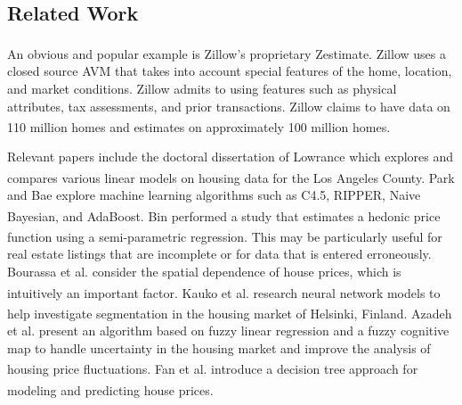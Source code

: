\documentclass[letter,10pt]{article}
\begin{document}
\begin{multicols}{2}
		\section{Related Work}
		An obvious and popular example is Zillow's proprietary Zestimate\textsuperscript{\textregistered}. Zillow uses a closed source AVM that takes into account special features of the home, location, and market conditions. Zillow admits to using features such as physical attributes, tax assessments, and prior transactions. Zillow claims to have data on 110 million homes and estimates on approximately 100 million homes.\textsuperscript{\cite{zillow}}
		\par
		Relevant papers include the doctoral dissertation of Lowrance which explores and compares various linear models on housing data for the Los Angeles County.\textsuperscript{\cite{lowrance}} Park and Bae explore machine learning algorithms such as C4.5, RIPPER, Naive Bayesian, and AdaBoost.\textsuperscript{\cite{park}} Bin performed a study that estimates a hedonic price function using a semi-parametric regression.\textsuperscript{\cite{bin}} This may be particularly useful for real estate listings that are incomplete or for data that is entered erroneously. Bourassa et al. consider the spatial dependence of house prices, which is intuitively an important factor.\textsuperscript{\cite{bourassa1}\cite{bourassa2}} Kauko et al. research neural network models to help investigate segmentation in the housing market of Helsinki, Finland.\textsuperscript{\cite{kauko}} Azadeh et al. present an algorithm based on fuzzy linear regression and a fuzzy cognitive map to handle uncertainty in the housing market and improve the analysis of housing price fluctuations.\textsuperscript{\cite{azadeh}} Fan et al. introduce a decision tree approach for modeling and predicting house prices.\textsuperscript{\cite{fan}}

\end{multicols}
\end{document}

